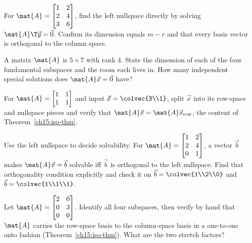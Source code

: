 \begin{exercise}\label{ch15:ex-leftnull}
For $\mat{A}=\begin{bmatrix}1&2\\2&4\\3&6\end{bmatrix}$, find the left nullspace directly by
solving $\mat{A}\T\vec{y}=\vec{0}$. Confirm its dimension equals $m-r$ and that every basis vector
is orthogonal to the column space.
\end{exercise}

\begin{exercise}\label{ch15:ex-dimcheck}
A matrix $\mat{A}$ is $5\times 7$ with rank $4$. State the dimension of each of the four
fundamental subspaces and the room each lives in. How many independent special solutions does
$\mat{A}\vec{x}=\vec{0}$ have?
\end{exercise}

\begin{exercise}\label{ch15:ex-splitting}
For $\mat{A}=\begin{bmatrix}1&1\\1&1\end{bmatrix}$ and input $\vec{x}=\colvec{3\\1}$, split
$\vec{x}$ into its row-space and nullspace pieces and verify that $\mat{A}\vec{x}=\mat{A}\vec{x}_
{\text{row}}$, the content of Theorem~\ref{ch15:iso-thm}.
\end{exercise}

\begin{exercise}\label{ch15:ex-solvability}
Use the left nullspace to decide solvability. For
$\mat{A}=\begin{bmatrix}1&2\\2&4\\0&1\end{bmatrix}$, a vector $\vec{b}$ makes
$\mat{A}\vec{x}=\vec{b}$ solvable iff $\vec{b}$ is orthogonal to the left nullspace. Find that
orthogonality condition explicitly and check it on $\vec{b}=\colvec{1\\2\\0}$ and
$\vec{b}=\colvec{1\\1\\1}$.
\end{exercise}

\begin{exercise}\label{ch15:ex-rowcol-iso}
Let $\mat{A}=\begin{bmatrix}2&0\\0&3\\0&0\end{bmatrix}$. Identify all four subspaces, then verify
by hand that $\mat{A}$ carries the row-space basis to the column-space basis in a one-to-one onto
fashion (Theorem~\ref{ch15:iso-thm}). What are the two stretch factors?
\end{exercise}

